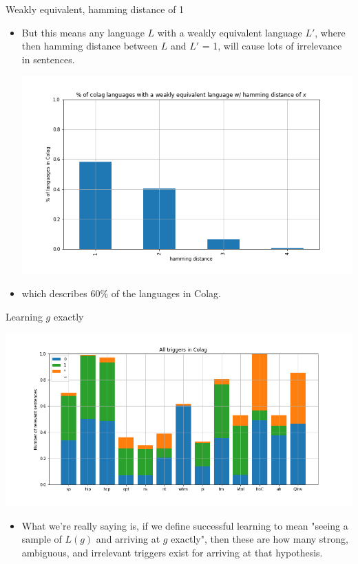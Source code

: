 \documentclass[presentation]{beamer}
\begin{document}
\begin{frame}[label={sec:orgb2ce0ff}]{Weakly equivalent, hamming distance of 1}
\begin{itemize}
\item But this means any language \(L\) with a weakly equivalent language \(L'\),
where then hamming distance between \(L\) and \(L'\) = 1, will cause lots of
irrelevance in sentences. \begin{center}
\includegraphics[width=.9\linewidth]{./images/weak-equiv-ham-dist.png}
\end{center}
\item which describes 60\% of the languages in Colag.
\end{itemize}
\end{frame}
\begin{frame}[label={sec:orgcabe6ad}]{Learning \(g\) exactly}
\begin{center}
\includegraphics[width=.9\linewidth]{./images/all-triggers.png}
\end{center}
\begin{itemize}
\item What we're really saying is, if we define successful learning to mean
"seeing a sample of \(L(g)\) and arriving at \(g\) exactly", then these are how
many strong, ambiguous, and irrelevant triggers exist for arriving at that
hypothesis.
\end{itemize}
\end{frame}
\end{document}
